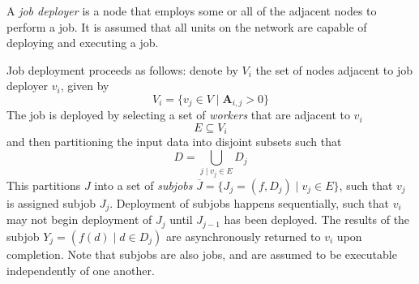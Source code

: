\documentclass[../mthe-493-project-proposal.tex]{subfiles}
\begin{document}
    A \textit{job deployer} is a node that employs some or all of the adjacent nodes to perform a job. It is assumed that all units on the network are capable of deploying and executing a job.

    Job deployment proceeds as follows: denote by $V_i$ the set of nodes adjacent to job deployer $v_i$, given by
    \begin{equation}
        \label{eq:adjacent-nodes}
        V_i = \{v_j \in V \mid \mathbf{A}_{i,j} > 0\}
    \end{equation}
    The job is deployed by selecting a set of \textit{workers} that are adjacent to $v_i$
    \begin{equation}
        \label{eq:workers}
        E \subseteq V_i
    \end{equation}
    and then partitioning the input data into disjoint subsets such that
    \begin{equation}
        \label{eq:subjob-partition}
        D = \bigcup\limits_{j \mid v_j \in E} D_j
    \end{equation}
    This partitions $J$ into a set of \textit{subjobs} $\overline{J} = \{J_j = (f, D_j) \mid v_j \in E\}$, such that $v_j$ is assigned subjob $J_j$. Deployment of subjobs happens sequentially, such that $v_i$ may not begin deployment of $J_j$ until $J_{j-1}$ has been deployed. The results of the subjob $Y_j = (f(d) \mid d \in D_j)$ are asynchronously returned to $v_i$ upon completion. Note that subjobs are also jobs, and are assumed to be executable independently of one another.
\end{document}
